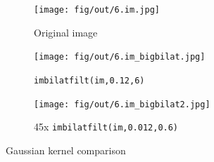 \documentclass[tikz,14pt,fleqn]{article}
\begin{document}
\begin{figure}[h!]
    \centering
    \begin{subfigure}[b]{0.325\linewidth}
        \centering
        \texttt{[image: fig/out/6.im.jpg]}
        \caption{Original image}
    \end{subfigure}
    \begin{subfigure}[b]{0.325\linewidth}
        \centering
        \texttt{[image: fig/out/6.im\_bigbilat.jpg]}
        \caption{\texttt{imbilatfilt(im,0.12,6)}}
    \end{subfigure}
    \begin{subfigure}[b]{0.325\linewidth}
        \centering
        \texttt{[image: fig/out/6.im\_bigbilat2.jpg]}
        \caption{45x \texttt{imbilatfilt(im,0.012,0.6)}}
        \label{fig:6.3}
    \end{subfigure}
    \caption{Gaussian kernel comparison}
    \label{fig:6}
\end{figure}
\end{document}
